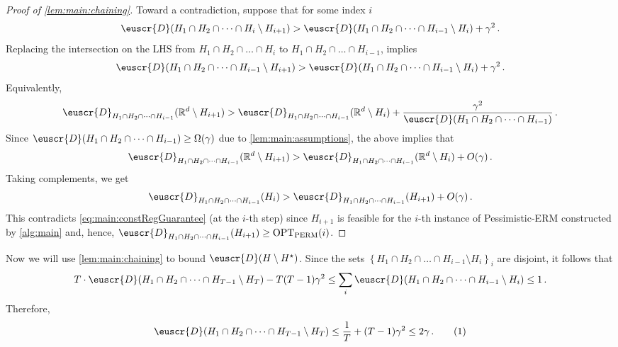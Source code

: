 \documentclass[11pt]{article}
\theoremstyle{plain}
\theoremstyle{definition}
\theoremstyle{remark}
\newcommand{\yesnum}{\addtocounter{equation}{1}\tag{\theequation}}
\newcommand{\inbrace}[1]{\left\{#1\right\}}
\newcommand{\R}{\mathbb{R}}
\newcommand{\opt}{\ensuremath{\mathrm{OPT}}}
\newcommand{\customcal}[1]{\euscr{#1}}
\newcommand{\cD}{\customcal{D}}
\newcommand{\pERM}{Pessimistic-ERM}
\newcommand{\optset}{{H^\star}}
\newcommand{\cDgiven}{\cD}
\begin{document}
            \begin{proof}[Proof of \cref{lem:main:chaining}]
                Toward a contradiction, suppose that for some index $i$
                \[
                    \cD(H_1\cap H_2\cap \dots \cap H_i\setminus H_{i+1})
                    > \cD(H_1\cap H_2\cap \dots \cap H_{i-1}\setminus H_{i}) + \gamma^2\,.
                \]
                Replacing the intersection on the LHS from $H_1\cap H_2\cap \dots \cap H_i$ to $H_1\cap H_2\cap \dots \cap H_{i-1}$, implies
                \[
                    \cD(H_1\cap H_2\cap \dots \cap H_{i-1}\setminus H_{i+1})
                    > \cD(H_1\cap H_2\cap \dots \cap H_{i-1}\setminus H_{i}) + \gamma^2\,.
                \]
                Equivalently, 
                \[
                    \cD_{H_1\cap H_2\cap \dots \cap H_{i-1}}(\R^d\setminus H_{i+1})
                    > \cD_{H_1\cap H_2\cap \dots \cap H_{i-1}}(\R^d\setminus H_{i}) 
                        + \frac{\gamma^2}{\cD(H_1\cap H_2\cap \dots \cap H_{i-1})}\,.
                \]
                Since $\cD(H_1\cap H_2\cap \dots \cap H_{i-1})\geq \Omega(\gamma)$ due to \cref{lem:main:assumptions}, the above implies that 
                \[
                    \cD_{H_1\cap H_2\cap \dots \cap H_{i-1}}(\R^d\setminus H_{i+1})
                    > \cD_{H_1\cap H_2\cap \dots \cap H_{i-1}}(\R^d\setminus H_{i}) 
                        + O(\gamma)\,.
                \]
                Taking complements, we get 
                \[
                    \cD_{H_1\cap H_2\cap \dots \cap H_{i-1}}(H_{i}) 
                    > \cD_{H_1\cap H_2\cap \dots \cap H_{i-1}}(H_{i+1})
                        + O(\gamma)\,.
                \]
                This contradicts \cref{eq:main:constRegGuarantee} (at the $i$-th step) since $H_{i+1}$ is feasible for the $i$-th instance of \pERM{} constructed by \cref{alg:main} and, hence, $\cD_{H_1\cap H_2\cap \dots \cap H_{i-1}}(H_{i+1})\geq \opt_{\rm PERM}(i)$.
            \end{proof}
            Now we will use \cref{lem:main:chaining} to bound $\cD(H\setminus\optset)$. 
            Since the sets $\inbrace{H_1\cap H_2\cap\dots \cap H_{i-1}\setminus H_i}_i$ are disjoint, it follows that 
            \[
                T\cdot \cD(H_1\cap H_2\cap \dots \cap H_{T-1} \setminus H_T)
                - T(T-1)\gamma^2
                \leq \sum_i \cDgiven(H_1 \cap H_2 \cap \dots \cap H_{i-1}\setminus H_i)
                \leq 1\,.
            \]
            Therefore, 
            \begin{align*}
                \cD(H_1\cap H_2\cap \dots \cap H_{T-1}\setminus H_T)
                \leq \frac{1}{T} + (T-1)\gamma^2
                \leq 2\gamma\,.
                \yesnum\label{eq:main:chainingGuarantee}
            \end{align*}%
\end{document}
